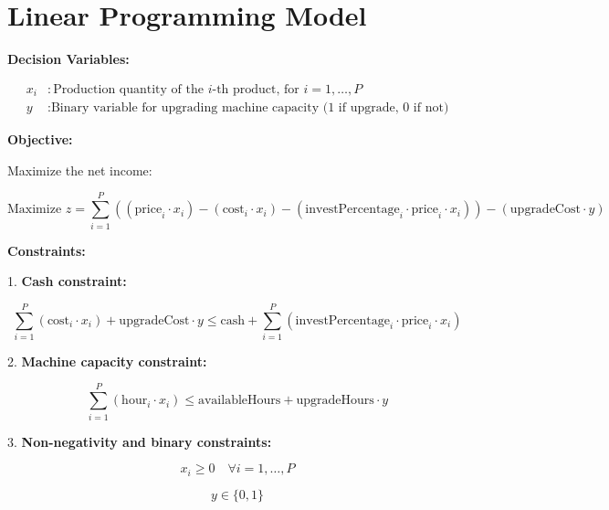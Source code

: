 \documentclass{article}
\begin{document}
\section*{Linear Programming Model}

\textbf{Decision Variables:}

\begin{align*}
x_i & : \text{Production quantity of the $i$-th product, for $i = 1, \ldots, P$} \\
y & : \text{Binary variable for upgrading machine capacity (1 if upgrade, 0 if not)}
\end{align*}

\textbf{Objective:}

Maximize the net income:

\[
\text{Maximize } z = \sum_{i=1}^{P} \left( (\text{price}_i \cdot x_i) - (\text{cost}_i \cdot x_i) - (\text{investPercentage}_i \cdot \text{price}_i \cdot x_i) \right) - (\text{upgradeCost} \cdot y)
\]

\textbf{Constraints:}

1. \textbf{Cash constraint:}

\[
\sum_{i=1}^{P} (\text{cost}_i \cdot x_i) + \text{upgradeCost} \cdot y \leq \text{cash} + \sum_{i=1}^{P} (\text{investPercentage}_i \cdot \text{price}_i \cdot x_i)
\]

2. \textbf{Machine capacity constraint:}

\[
\sum_{i=1}^{P} (\text{hour}_i \cdot x_i) \leq \text{availableHours} + \text{upgradeHours} \cdot y
\]

3. \textbf{Non-negativity and binary constraints:}

\[
x_i \geq 0 \quad \forall i = 1, \ldots, P
\]

\[
y \in \{0, 1\}
\]
\end{document}
